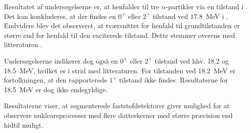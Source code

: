 
Resultatet af undersøgelserne er, at \Carb henfalder til tre $\alpha$-partikler via en tilstand i
\Be. Det kan konkluderes, at der findes en $0^{+}$ eller $2^{+}$ tilstand ved \SI{17.8}{\MeV} i
\Carb. Endvidere blev det observeret, at tværsnittet for henfald til grundtilstanden er større end for
henfald til den exciterede tilstand. Dette stemmer overens med litteraturen \cite{States}.

Undersøgelserne indikerer dog også en $0^{+}$ eller $2^{+}$ tilstand ved hhv. \num{18.2} og
\SI{18.5}{\MeV}, hvilket er i strid med litteraturen. For tilstanden ved \SI{18.2}{\MeV} er
fortolkningen, at den rapporterede $1^{+}$ tilstand ikke findes. Resultaterne for \SI{18.5}{\MeV} er
dog ikke endegyldige.

Resultaterne viser, at segmenterede faststofdetektorer giver mulighed for at observere
nukleareprocesser med flere datterkerner med større præcision end hidtil muligt. 




\endgroup
